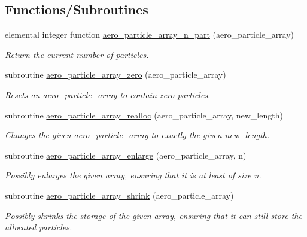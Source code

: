 \subsection*{Functions/\+Subroutines}
\begin{DoxyCompactItemize}
\item 
elemental integer function \mbox{\hyperlink{namespacepmc__aero__particle__array_a07eb4b0a376bb87a889b7d9070f46b90}{aero\+\_\+particle\+\_\+array\+\_\+n\+\_\+part}} (aero\+\_\+particle\+\_\+array)
\begin{DoxyCompactList}\small\item\em Return the current number of particles. \end{DoxyCompactList}\item 
subroutine \mbox{\hyperlink{namespacepmc__aero__particle__array_aba7d47622753636d93746a4cbe3c0222}{aero\+\_\+particle\+\_\+array\+\_\+zero}} (aero\+\_\+particle\+\_\+array)
\begin{DoxyCompactList}\small\item\em Resets an aero\+\_\+particle\+\_\+array to contain zero particles. \end{DoxyCompactList}\item 
subroutine \mbox{\hyperlink{namespacepmc__aero__particle__array_a72e276df4d9db217ea0b63eb8d518d1b}{aero\+\_\+particle\+\_\+array\+\_\+realloc}} (aero\+\_\+particle\+\_\+array, new\+\_\+length)
\begin{DoxyCompactList}\small\item\em Changes the given aero\+\_\+particle\+\_\+array to exactly the given new\+\_\+length. \end{DoxyCompactList}\item 
subroutine \mbox{\hyperlink{namespacepmc__aero__particle__array_a49841804057f30972e8c2c855c0a8a27}{aero\+\_\+particle\+\_\+array\+\_\+enlarge}} (aero\+\_\+particle\+\_\+array, n)
\begin{DoxyCompactList}\small\item\em Possibly enlarges the given array, ensuring that it is at least of size n. \end{DoxyCompactList}\item 
subroutine \mbox{\hyperlink{namespacepmc__aero__particle__array_a0b023fbb97338eae021e719a3044b66a}{aero\+\_\+particle\+\_\+array\+\_\+shrink}} (aero\+\_\+particle\+\_\+array)
\begin{DoxyCompactList}\small\item\em Possibly shrinks the storage of the given array, ensuring that it can still store the allocated particles. \end{DoxyCompactList}\item 

\end{DoxyCompactItemize}
